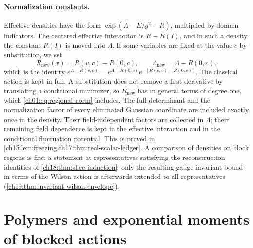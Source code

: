 \paragraph{Normalization constants.}
Effective densities have the form $\exp(\Lambda-E/g^2-R)$, multiplied by domain indicators. The centered effective interaction is $R-R(I)$, and in such a density the constant $R(I)$ is moved into $\Lambda$. If some variables are fixed at the value $c$ by substitution, we set
\[
 R_{\mathrm{new}}(v)=R(v,c)-R(0,c),\qquad
 \Lambda_{\mathrm{new}}=\Lambda-R(0,c),
\]
which is the identity $e^{\Lambda-R(v,c)}=e^{\Lambda-R(0,c)}e^{-[R(v,c)-R(0,c)]}$. The classical action is kept in full. A substitution does not remove a first derivative by translating a conditional minimizer, so $R_{\mathrm{new}}$ has in general terms of degree one, which \eqref{ch01:eq:regional-norm} includes. The full determinant and the normalization factor of every eliminated Gaussian coordinate are included exactly once in the density. Their field-independent factors are collected in $\Lambda$; their remaining field dependence is kept in the effective interaction and in the conditional fluctuation potential. This is proved in \cref{ch15:lem:freezing,ch17:thm:real-scalar-ledger}. A comparison of densities on block regions is first a statement at representatives satisfying the reconstruction identities of \cref{ch18:thm:slice-induction}; only the resulting gauge-invariant bound in terms of the Wilson action is afterwards extended to all representatives (\cref{ch19:thm:invariant-wilson-envelope}).

\section{Polymers and exponential moments of blocked actions}\label{ch01:sec:polymers}

